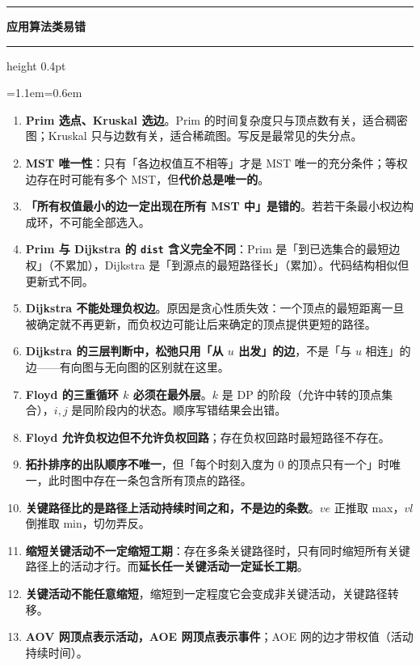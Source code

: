 \documentclass[11pt,openany,UTF8]{ctexbook}
\newcommand{\callouthead}[2]{%
  \par\addvspace{7pt}\noindent
  {\color{#1}\rule[-0.15em]{3pt}{1.05em}}\hspace{0.5em}%
  {\bfseries\color{#1}#2}\par\nobreak\vspace{-0.35em}%
  {\color{rulesep}\hrule height 0.4pt}\nobreak\vspace{0.45em}%
  \begingroup\small\setlength{\parindent}{0pt}%
  \leftskip=1.1em\rightskip=0.6em\noindent\ignorespaces}
\newcommand{\calloutend}{\par\endgroup\addvspace{7pt}}
\newenvironment{callwarn}[1]{\callouthead{warnbar}{#1}}{\calloutend}
\begin{document}
\begin{callwarn}{应用算法类易错}
\begin{enumerate}
\item \textbf{Prim 选点、Kruskal 选边}。Prim 的时间复杂度只与顶点数有关，适合稠密图；Kruskal 只与边数有关，适合稀疏图。写反是最常见的失分点。
\item \textbf{MST 唯一性}：只有「各边权值互不相等」才是 MST 唯一的充分条件；等权边存在时可能有多个 MST，但\textbf{代价总是唯一的}。
\item \textbf{「所有权值最小的边一定出现在所有 MST 中」是错的}。若若干条最小权边构成环，不可能全部选入。
\item \textbf{Prim 与 Dijkstra 的 \texttt{dist} 含义完全不同}：Prim 是「到已选集合的最短边权」（不累加），Dijkstra 是「到源点的最短路径长」（累加）。代码结构相似但更新式不同。
\item \textbf{Dijkstra 不能处理负权边}。原因是贪心性质失效：一个顶点的最短距离一旦被确定就不再更新，而负权边可能让后来确定的顶点提供更短的路径。
\item \textbf{Dijkstra 的三层判断中，松弛只用「从 $u$ 出发」的边}，不是「与 $u$ 相连」的边——有向图与无向图的区别就在这里。
\item \textbf{Floyd 的三重循环 $k$ 必须在最外层}。$k$ 是 DP 的阶段（允许中转的顶点集合），$i,j$ 是同阶段内的状态。顺序写错结果会出错。
\item \textbf{Floyd 允许负权边但不允许负权回路}；存在负权回路时最短路径不存在。
\item \textbf{拓扑排序的出队顺序不唯一}，但「每个时刻入度为 0 的顶点只有一个」时唯一，此时图中存在一条包含所有顶点的路径。
\item \textbf{关键路径比的是路径上活动持续时间之和，不是边的条数}。$ve$ 正推取 max，$vl$ 倒推取 min，切勿弄反。
\item \textbf{缩短关键活动不一定缩短工期}：存在多条关键路径时，只有同时缩短所有关键路径上的活动才行。而\textbf{延长任一关键活动一定延长工期}。
\item \textbf{关键活动不能任意缩短}，缩短到一定程度它会变成非关键活动，关键路径转移。
\item \textbf{AOV 网顶点表示活动，AOE 网顶点表示事件}；AOE 网的边才带权值（活动持续时间）。
\end{enumerate}
\end{callwarn}
\end{document}

